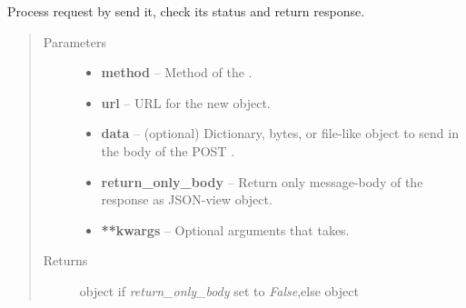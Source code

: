 \documentclass[letterpaper,10pt,english]{sphinxmanual}
\begin{document}

\begin{fulllineitems}
\label{web_portal:core.courses.utils.process_request}
Process request by send it, check its status and return response.
\begin{quote}\begin{description}
\item[{Parameters}] \leavevmode\begin{itemize}
\item {} 
\textbf{method} -- Method of the .

\item {} 
\textbf{url} -- URL for the new  object.

\item {} 
\textbf{data} -- (optional) Dictionary, bytes, or file-like object to send in the body of the POST .

\item {} 
\textbf{return\_only\_body} -- Return only message-body of the response as JSON-view object.

\item {} 
\textbf{**kwargs} -- Optional arguments that  takes.

\end{itemize}

\item[{Returns}] \leavevmode
{} object if \emph{return\_only\_body} set to \emph{False},else  object

\end{description}\end{quote}

\end{fulllineitems}

\end{document}
